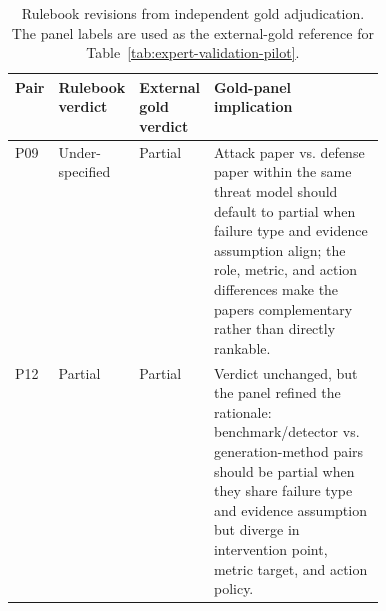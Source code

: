 \documentclass[11pt]{article}
\begin{document}
\begin{table}[t]
\centering
\scriptsize
\renewcommand{\arraystretch}{0.9}
\begin{tabularx}{\linewidth}{>{\raggedright\arraybackslash}p{0.09\linewidth}>{\raggedright\arraybackslash}p{0.16\linewidth}>{\raggedright\arraybackslash}p{0.18\linewidth}X}
\toprule
\textbf{Pair} & \textbf{Rulebook verdict} & \textbf{External gold verdict} & \textbf{Gold-panel implication} \\
\midrule
P09 & Under-specified & Partial & Attack paper vs. defense paper within the same threat model should default to partial when failure type and evidence assumption align; the role, metric, and action differences make the papers complementary rather than directly rankable. \\
P12 & Partial & Partial & Verdict unchanged, but the panel refined the rationale: benchmark/detector vs. generation-method pairs should be partial when they share failure type and evidence assumption but diverge in intervention point, metric target, and action policy. \\
\bottomrule
\end{tabularx}
\caption{Rulebook revisions from independent gold adjudication. The panel labels are used as the external-gold reference for Table~\ref{tab:expert-validation-pilot}.}
\label{tab:gold-adjudication-revisions}
\end{table}

\end{document}
